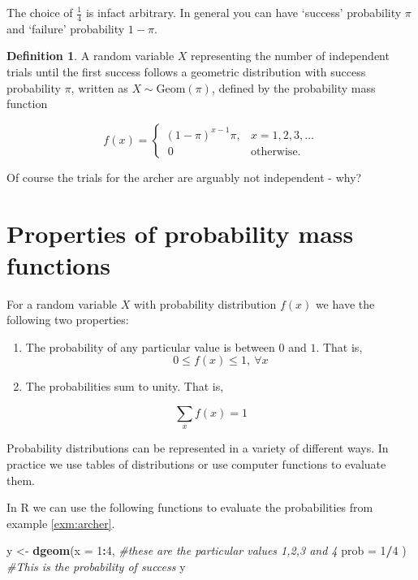 \documentclass[
]{book}
\newenvironment{Shaded}{\begin{snugshade}}{\end{snugshade}}
\newcommand{\CommentTok}[1]{\textcolor[rgb]{0.56,0.35,0.01}{\textit{#1}}}
\newcommand{\DataTypeTok}[1]{\textcolor[rgb]{0.13,0.29,0.53}{#1}}
\newcommand{\DecValTok}[1]{\textcolor[rgb]{0.00,0.00,0.81}{#1}}
\newcommand{\KeywordTok}[1]{\textcolor[rgb]{0.13,0.29,0.53}{\textbf{#1}}}
\newcommand{\NormalTok}[1]{#1}
\newcommand{\OperatorTok}[1]{\textcolor[rgb]{0.81,0.36,0.00}{\textbf{#1}}}
\newcommand{\StringTok}[1]{\textcolor[rgb]{0.31,0.60,0.02}{#1}}
\theoremstyle{definition}
\newtheorem{definition}{Definition}[chapter]
\theoremstyle{definition}
\theoremstyle{definition}
\theoremstyle{definition}
\theoremstyle{remark}
\begin{document}
The choice of \(\frac{1}{4}\) is infact arbitrary. In general you can have `success' probability \(\pi\) and `failure' probability \(1-\pi\).

\begin{definition}
A random variable \(X\) representing the number of independent trials until the first success follows a geometric distribution with success probability \(\pi\), written as \(X \sim \text{Geom}(\pi)\), defined by the probability mass function

\begin{equation*}
  f(x)=\begin{cases}
    \left( 1-\pi \right)^{x-1}\pi , & x = 1, 2, 3, \dots \\
    \ 0 \ & \text{otherwise}.
  \end{cases}
\end{equation*}
\end{definition}

Of course the trials for the archer are arguably not independent - why?

\hypertarget{properties-of-probability-mass-functions}{%
\section{Properties of probability mass functions}\label{properties-of-probability-mass-functions}}

For a random variable \(X\) with probability distribution \(f(x)\) we have the following two properties:

\begin{enumerate}
\def\labelenumi{\arabic{enumi}.}
\item
  The probability of any particular value is between \(0\) and \(1\). That is,
  \[ 0 \leq f(x) \leq 1, \ \forall x\]
\item
  The probabilities sum to unity. That is,
\end{enumerate}

\[ \sum_{x} f(x)= 1\]

Probability distributions can be represented in a variety of different ways. In practice we use tables of distributions or use computer functions to evaluate them.

In R we can use the following functions to evaluate the probabilities from example \ref{exm:archer}.

\begin{Shaded}
\begin{Highlighting}[]
\NormalTok{y <-}\StringTok{ }\KeywordTok{dgeom}\NormalTok{(}\DataTypeTok{x =} \DecValTok{1}\OperatorTok{:}\DecValTok{4}\NormalTok{, }\CommentTok{#these are the particular values 1,2,3 and 4}
           \DataTypeTok{prob =} \DecValTok{1}\OperatorTok{/}\DecValTok{4}\NormalTok{ ) }\CommentTok{#This is the probability of success}
\NormalTok{y}
\end{Highlighting}
\end{Shaded}
\end{document}
